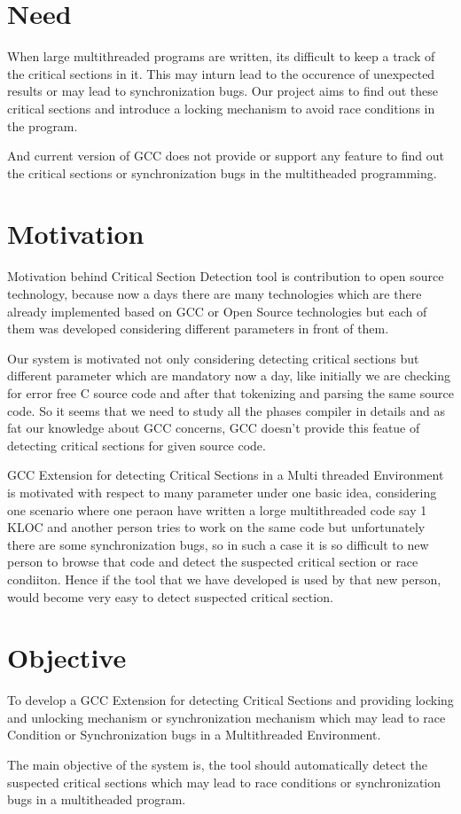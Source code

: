 \section{Need}
When large multithreaded programs are written, its difficult to keep a track of the critical sections in it. This may inturn lead to the occurence of unexpected results or may lead to synchronization bugs. Our project aims to find out these critical sections and introduce a locking mechanism to avoid race conditions in the program.

And current version of GCC does not provide or support any feature to find out the critical sections or synchronization bugs in the multitheaded programming.

\section{Motivation}


Motivation behind Critical Section Detection tool is contribution to open source technology, because now a days there are many technologies which are there already implemented based on GCC or Open Source technologies but each of them was developed considering different parameters in front of them. 

Our system is motivated not only considering detecting critical sections but different parameter which are mandatory now a day, like initially we are checking for error free C source code and after that tokenizing and parsing the same source code. So it seems that we need to study all the phases compiler in details and as fat our knowledge about GCC concerns, GCC doesn't provide this featue of detecting critical sections for given source code.

GCC Extension for detecting Critical Sections in a Multi threaded Environment is motivated with respect to many parameter under one basic idea, considering one scenario where one peraon have written a lorge multithreaded code say 1 KLOC and another person tries to work on the same code but unfortunately there are some synchronization bugs, so in such a case it is so difficult to new person to browse that code and detect the suspected critical section or race condiiton. Hence if the tool that we have developed is used by that new person, would become very easy to detect suspected critical section.\\

\section{Objective}
To develop a GCC Extension for detecting Critical Sections and providing locking and unlocking mechanism or synchronization mechanism which may lead to race Condition or Synchronization bugs in a Multithreaded Environment.

The main objective of the system is, the tool should automatically detect the suspected critical sections which may lead to race conditions or synchronization bugs in a multitheaded program.

